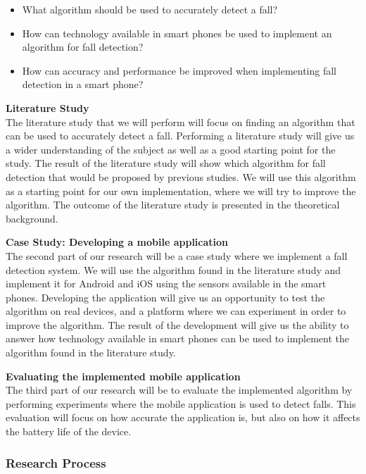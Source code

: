 \documentclass[12pt, a4paper, onecolumn]{article}
\newcommand{\parag}[1]{
	\textbf{#1} \hspace{0pt} \\
}
\begin{document}
	\begin{itemize}
		\item What algorithm should be used to accurately detect a fall?
		\item How can technology available in smart phones be used to implement an algorithm for fall detection?
		\item How can accuracy and performance be improved when implementing fall detection in a smart phone?
	\end{itemize}
	
	\parag{Literature Study}
	The literature study that we will perform will focus on finding an algorithm that can be used to accurately detect a fall. Performing a literature study will give us a wider understanding of the subject as well as a good starting point for the study. The result of the literature study will show which algorithm for fall detection that would be proposed by previous studies. We will use this algorithm as a starting point for our own implementation, where we will try to improve the algorithm. The outcome of the literature study is presented in the theoretical background.
	
	\parag{Case Study: Developing a mobile application}
	The second part of our research will be a case study where we implement a fall detection system. We will use the algorithm found in the literature study and implement it for Android and iOS using the sensors available in the smart phones. Developing the application will give us an opportunity to test the algorithm on real devices, and a platform where we can experiment in order to improve the algorithm. The result of the development will give us the ability to answer how technology available in smart phones can be used to implement the algorithm found in the literature study.
	
	\parag{Evaluating the implemented mobile application}
	The third part of our research will be to evaluate the implemented algorithm by performing experiments where the mobile application is used to detect falls. This evaluation will focus on how accurate the application is, but also on how it affects the battery life of the device.
	
	\subsubsection{Research Process}
	
\end{document}

